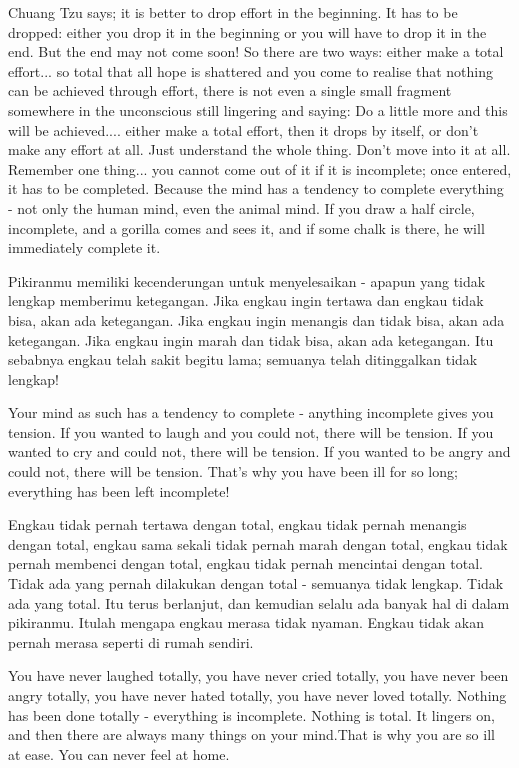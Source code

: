 \english
Chuang Tzu says; it is better to drop effort in the beginning. It has to be dropped: either you drop it in the beginning or you will have to drop it in the end. But the end may not come soon! So there are two ways: either make a total effort... so total that all hope is shattered and you come to realise that nothing can be achieved through effort, there is not even a single small fragment somewhere in the unconscious still lingering and saying: Do a little more and this will be achieved.... either make a total effort, then it drops by itself, or don't make any effort at all. Just understand the whole thing. Don't move into it at all. Remember one thing... you cannot come out of it if it is incomplete; once entered, it has to be completed. Because the mind has a tendency to complete everything - not only the human mind, even the animal mind. If you draw a half circle, incomplete, and a gorilla comes and sees it, and if some chalk is there, he will immediately complete it.

\bahasa
Pikiranmu memiliki kecenderungan untuk menyelesaikan - apapun yang tidak lengkap memberimu ketegangan. Jika engkau ingin tertawa dan engkau tidak bisa, akan ada ketegangan. Jika engkau ingin menangis dan tidak bisa, akan ada ketegangan. Jika engkau ingin marah dan tidak bisa, akan ada ketegangan. Itu sebabnya engkau telah sakit begitu lama; semuanya telah ditinggalkan tidak lengkap!

\english
Your mind as such has a tendency to complete - anything incomplete gives you tension. If you wanted to laugh and you could not, there will be tension. If you wanted to cry and could not, there will be tension. If you wanted to be angry and could not, there will be tension. That's why you have been ill for so long; everything has been left incomplete!

\bahasa
Engkau tidak pernah tertawa dengan total, engkau tidak pernah menangis dengan total, engkau sama sekali tidak pernah marah dengan total, engkau tidak pernah membenci dengan total, engkau tidak pernah mencintai dengan total. Tidak ada yang pernah dilakukan dengan total - semuanya tidak lengkap. Tidak ada yang total. Itu terus berlanjut, dan kemudian selalu ada banyak hal di dalam pikiranmu. Itulah mengapa engkau merasa tidak nyaman. Engkau tidak akan pernah merasa seperti di rumah sendiri.

\english
You have never laughed totally, you have never cried totally, you have never been angry totally, you have never hated totally, you have never loved totally. Nothing has been done totally - everything is incomplete. Nothing is total. It lingers on, and then there are always many things on your mind.That is why you are so ill at ease. You can never feel at home.


